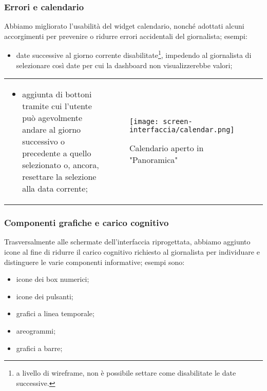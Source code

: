 \begin{frame}
    \frametitle{Errori e calendario}
    \label{f:errori}
    Abbiamo migliorato l'usabilità del widget calendario, nonché adottati alcuni accorgimenti per prevenire o ridurre errori accidentali del giornalista; esempi:
    \begin{itemize}
        \item date successive al giorno corrente disabilitate\footnote{a livello di wireframe, non è possibile settare come disabilitate le date successive.}, impedendo al giornalista di selezionare così date per cui la dashboard non visualizzerebbe valori;
    \end{itemize}
    \begin{tabular}{p{}p{}}    
        \begin{itemize}
            \item aggiunta di bottoni tramite cui l'utente può agevolmente andare al giorno successivo o precedente a quello selezionato o, ancora, resettare la selezione alla data corrente; 
        \end{itemize} &
            
        \begin{figure}
            \centering
            \vspace{-10pt}
            \texttt{[image: screen-interfaccia/calendar.png]}
            \caption{Calendario aperto in "Panoramica"} 
        \end{figure}  \\
    \end{tabular}   
    
\end{frame}

\begin{frame}
    \frametitle{Componenti grafiche e carico cognitivo}
    \label{f:grafica}
    Trasversalmente alle schermate dell'interfaccia riprogettata, abbiamo aggiunto icone al fine di ridurre il carico cognitivo richiesto al giornalista per individuare e distinguere le varie componenti informative; esempi sono:
    \begin{itemize}
        \item icone dei box numerici;
        \item icone dei pulsanti;
        \item grafici a linea temporale;
        \item areogrammi;
        \item grafici a barre;
    \end{itemize}
\end{frame}

